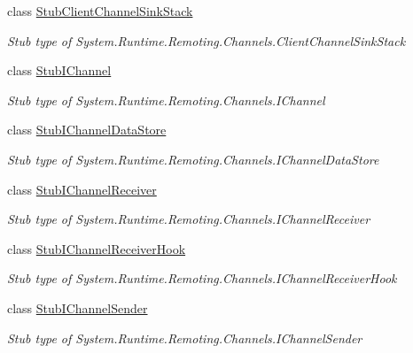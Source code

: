 \begin{DoxyCompactItemize}
class \hyperlink{class_system_1_1_runtime_1_1_remoting_1_1_channels_1_1_fakes_1_1_stub_client_channel_sink_stack}{Stub\-Client\-Channel\-Sink\-Stack}
\begin{DoxyCompactList}\small\item\em Stub type of System.\-Runtime.\-Remoting.\-Channels.\-Client\-Channel\-Sink\-Stack\end{DoxyCompactList}\item 
class \hyperlink{class_system_1_1_runtime_1_1_remoting_1_1_channels_1_1_fakes_1_1_stub_i_channel}{Stub\-I\-Channel}
\begin{DoxyCompactList}\small\item\em Stub type of System.\-Runtime.\-Remoting.\-Channels.\-I\-Channel\end{DoxyCompactList}\item 
class \hyperlink{class_system_1_1_runtime_1_1_remoting_1_1_channels_1_1_fakes_1_1_stub_i_channel_data_store}{Stub\-I\-Channel\-Data\-Store}
\begin{DoxyCompactList}\small\item\em Stub type of System.\-Runtime.\-Remoting.\-Channels.\-I\-Channel\-Data\-Store\end{DoxyCompactList}\item 
class \hyperlink{class_system_1_1_runtime_1_1_remoting_1_1_channels_1_1_fakes_1_1_stub_i_channel_receiver}{Stub\-I\-Channel\-Receiver}
\begin{DoxyCompactList}\small\item\em Stub type of System.\-Runtime.\-Remoting.\-Channels.\-I\-Channel\-Receiver\end{DoxyCompactList}\item 
class \hyperlink{class_system_1_1_runtime_1_1_remoting_1_1_channels_1_1_fakes_1_1_stub_i_channel_receiver_hook}{Stub\-I\-Channel\-Receiver\-Hook}
\begin{DoxyCompactList}\small\item\em Stub type of System.\-Runtime.\-Remoting.\-Channels.\-I\-Channel\-Receiver\-Hook\end{DoxyCompactList}\item 
class \hyperlink{class_system_1_1_runtime_1_1_remoting_1_1_channels_1_1_fakes_1_1_stub_i_channel_sender}{Stub\-I\-Channel\-Sender}
\begin{DoxyCompactList}\small\item\em Stub type of System.\-Runtime.\-Remoting.\-Channels.\-I\-Channel\-Sender\end{DoxyCompactList}\item 

\end{DoxyCompactItemize}
